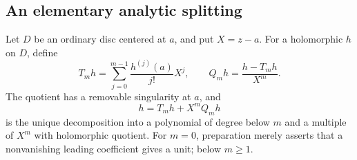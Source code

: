 \documentclass[11pt,letterpaper]{article}
\numberwithin{equation}{section}
\theoremstyle{definition}
\theoremstyle{remark}
\begin{document}
\subsection{An elementary analytic splitting}

Let $D$ be an ordinary disc centered at $a$, and put $X=z-a$. For a
holomorphic $h$ on $D$, define
\[
 T_m h=\sum_{j=0}^{m-1}\frac{h^{(j)}(a)}{j!}X^j,
 \qquad Q_mh=\frac{h-T_mh}{X^m}.
\]
The quotient has a removable singularity at $a$, and
\begin{equation}\label{eq:splitting}
 h=T_mh+X^mQ_mh
\end{equation}
is the unique decomposition into a polynomial of degree below $m$ and a
multiple of $X^m$ with holomorphic quotient. For $m=0$, preparation merely
asserts that a nonvanishing leading coefficient gives a unit; below $m\ge1$.
\end{document}
